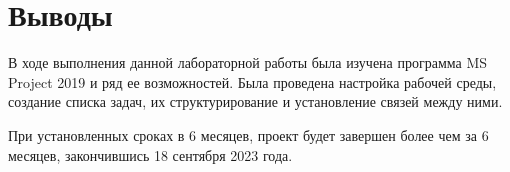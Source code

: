 \chapter{Выводы}

В ходе выполнения данной лабораторной работы была изучена программа MS Project 2019 и ряд ее возможностей. Была проведена настройка рабочей среды, создание списка задач, их структурирование и установление связей между ними.

При установленных сроках в 6 месяцев, проект будет завершен более чем за 6 месяцев, закончившись 18 сентября 2023 года.